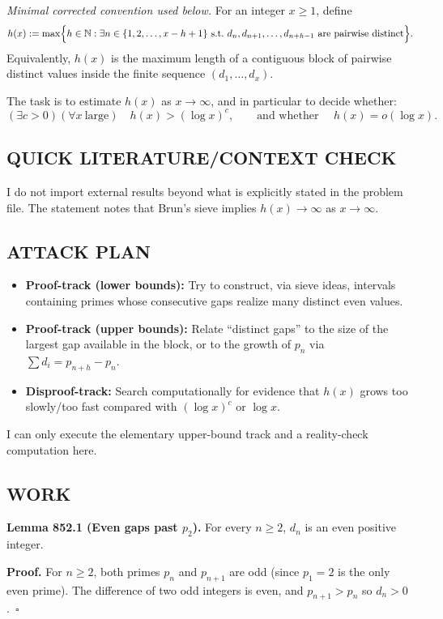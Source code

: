 \emph{Minimal corrected convention used below.} For an integer $x\ge 1$, define
\[
  h(x) := \max\Bigl\{h\in\mathbb{N}: \exists n\in\{1,2,\dots,x-h+1\}\ \text{s.t.}\ d_n,d_{n+1},\dots,d_{n+h-1}\ \text{are pairwise distinct}\Bigr\}.
\]
Equivalently, $h(x)$ is the maximum length of a contiguous block of pairwise distinct values inside the finite sequence $(d_1,\dots,d_x)$.

The task is to estimate $h(x)$ as $x\to\infty$, and in particular to decide whether:
\[
  (\exists c>0)(\forall x\ \text{large})\quad h(x)>(\log x)^c,\qquad\text{and whether }\quad h(x)=o(\log x).
\]

\subsection*{QUICK LITERATURE/CONTEXT CHECK}
I do not import external results beyond what is explicitly stated in the problem file.  The statement notes that Brun's sieve implies $h(x)\to\infty$ as $x\to\infty$.

\subsection*{ATTACK PLAN}
\begin{itemize}
\item \textbf{Proof-track (lower bounds):} Try to construct, via sieve ideas, intervals containing primes whose consecutive gaps realize many distinct even values.
\item \textbf{Proof-track (upper bounds):} Relate ``distinct gaps'' to the size of the largest gap available in the block, or to the growth of $p_n$ via $\sum d_i = p_{n+h}-p_n$.
\item \textbf{Disproof-track:} Search computationally for evidence that $h(x)$ grows too slowly/too fast compared with $(\log x)^c$ or $\log x$.
\end{itemize}
I can only execute the elementary upper-bound track and a reality-check computation here.

\subsection*{WORK}
\textbf{Lemma 852.1 (Even gaps past $p_2$).}
For every $n\ge 2$, $d_n$ is an even positive integer.

\textbf{Proof.}
For $n\ge 2$, both primes $p_n$ and $p_{n+1}$ are odd (since $p_1=2$ is the only even prime).  The difference of two odd integers is even, and $p_{n+1}>p_n$ so $d_n>0$.\ $\square$

